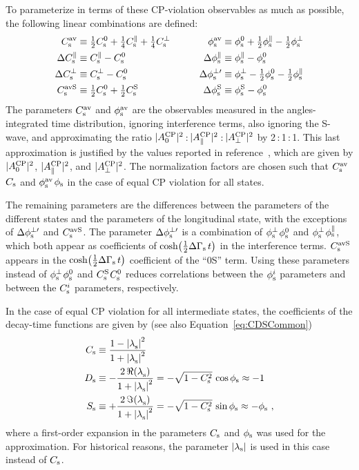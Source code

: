 To parameterize in terms of these CP-violation observables as much as possible, the following linear combinations are defined:
\begin{equation}
  \label{eq:CPVParamDef}
  \begin{alignedat}{2}
    \Csav      &\equiv \tfrac{1}{2}\Cszero + \tfrac{1}{4}\Cspar + \tfrac{1}{4}\Csperp \qquad\quad&
      \phisav       &\equiv \phiszero + \tfrac{1}{2}\phispar - \tfrac{1}{2}\phisperp \\
    \DelCspara &\equiv \Cspar  - \Cszero &
      \Delphispara  &\equiv \phispar - \phiszero \\
    \DelCsperp &\equiv \Csperp - \Cszero &
      \Delphisperpp &\equiv \phisperp - \tfrac{1}{2}\phiszero - \tfrac{1}{2}\phispar \\
    \CsavS     &\equiv \tfrac{1}{2}\Cszero + \tfrac{1}{2}\CsS &
      \DelphisS  &\equiv \phisS - \phiszero \\
  \end{alignedat}
\end{equation}
The parameters $\Csav$ and $\phisav$ are the observables measured in the angles-integrated time distribution, ignoring interference terms,
also ignoring the S-wave, and approximating the ratio $\magzeroAvSq$\,:\,$\magparAvSq$\,:\,$\magperpAvSq$ by 2\,:\,1\,:\,1.  This last
approximation is justified by the values reported in reference~\cite{LHCb-PAPER-2013-002,*LHCb-ANA-2012-067}, which are given by
$\magzeroAvSq$, $\magparAvSq$, and $\magperpAvSq$. The normalization factors are chosen such
that $\Csav$\textto$\Cs$ and $\phisav$\textto$\phis$ in the case of equal CP violation for all states.

The remaining parameters are the differences between the parameters of the different states and the parameters of the longitudinal state,
with the exceptions of $\Delphisperpp$ and $\CsavS$. The parameter $\Delphisperpp$ is a combination of $\phisperp$\textminus$\phiszero$ and
$\phisperp$\textminus$\phispar$, which both appear as coefficients of $\cDGs$ in the interference terms. $\CsavS$ appears in the $\cDGs$
coefficient of the ``0S'' term. Using these parameters instead of $\phisperp$\textminus$\phiszero$ and $\CsS$\textminus$\Cszero$ reduces
correlations between the $\phisi$ parameters and between the $\Csi$ parameters, respectively.

In the case of equal CP violation for all intermediate states, the coefficients of the decay-time functions are given by (see also
Equation~\ref{eq:CDSCommon})
\begin{equation}
  \begin{aligned}
    \Cs &\equiv \frac{1-\lamsiSq[]}{1+\lamsiSq[]} \\
    \Ds &\equiv -\frac{2\,\Re(\lamsi[])}{1+\lamsiSq[]} = -\sqrt{1-\Cs^2}\, \cos\phis \approx -1 \\
    \Ss &\equiv +\frac{2\,\Im(\lamsi[])}{1+\lamsiSq[]} = -\sqrt{1-\Cs^2}\, \sin\phis \approx -\phis \ ,
  \end{aligned}
\end{equation}
where a first-order expansion in the parameters $\Cs$ and $\phis$ was used for the approximation. For historical reasons, the parameter
$\lamsAbs$ is used in this case instead of $\Cs$.

